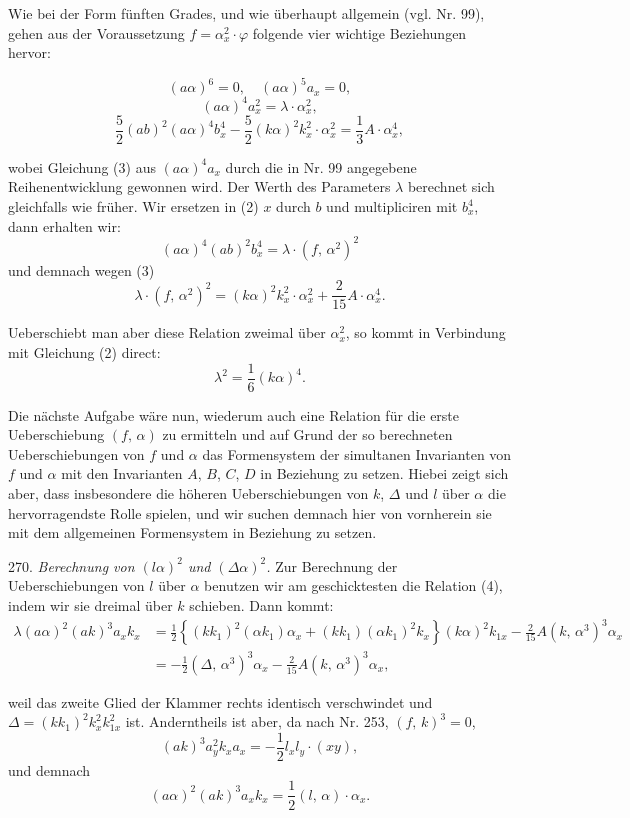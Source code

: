 \documentclass[11pt]{article}
\providecommand{\weberpage}[1]{}
\providecommand{\weq}[2]{\begin{equation}\tag{#1}#2\end{equation}}
\let\Delta\varDelta
\begin{document}
Wie bei der Form fünften Grades, und wie überhaupt allgemein (vgl. Nr. 99), gehen aus der Voraussetzung $f=\alpha_x^2\cdot\varphi$ folgende vier wichtige Beziehungen hervor:


\weberpage{292}

\weq{1}{(a\alpha)^6=0,\quad (a\alpha)^5a_x=0,}
\weq{2}{(a\alpha)^4a_x^2=\lambda\cdot\alpha_x^2,}
\weq{3}{\frac{5}{2}(ab)^2(a\alpha)^4b_x^4 - \frac{5}{2}(k\alpha)^2k_x^2\cdot\alpha_x^2=\frac{1}{3}A\cdot\alpha_x^4,}

wobei Gleichung (3) aus $(a\alpha)^4a_x$ durch die in Nr. 99 angegebene Reihenentwicklung gewonnen wird. Der Werth des Parameters $\lambda$ berechnet sich gleichfalls wie früher. Wir ersetzen in (2) $x$ durch $b$ und multipliciren mit $b_x^4$, dann erhalten wir:
\[
(a\alpha)^4(ab)^2b_x^4=\lambda\cdot(f,\,\alpha^2)^2
\]
und demnach wegen (3)
\weq{4}{\lambda\cdot(f,\,\alpha^2)^2=(k\alpha)^2k_x^2\cdot\alpha_x^2+\frac{2}{15}A\cdot\alpha_x^4.}

Ueberschiebt man aber diese Relation zweimal über $\alpha_x^2$, so kommt in Verbindung mit Gleichung (2) direct:
\weq{5}{\lambda^2=\frac{1}{6}(k\alpha)^4.}

Die nächste Aufgabe wäre nun, wiederum auch eine Relation für die erste Ueberschiebung $(f,\,\alpha)$ zu ermitteln und auf Grund der so berechneten Ueberschiebungen von $f$ und $\alpha$ das Formensystem der simultanen Invarianten von $f$ und $\alpha$ mit den Invarianten $A$, $B$, $C$, $D$ in Beziehung zu setzen. Hiebei zeigt sich aber, dass insbesondere die höheren Ueberschiebungen von $k$, $\Delta$ und $l$ über $\alpha$ die hervorragendste Rolle spielen, und wir suchen demnach hier von vornherein sie mit dem allgemeinen Formensystem in Beziehung zu setzen.

270. \textit{Berechnung von $(l\alpha)^2$ und $(\Delta\alpha)^2$.} Zur Berechnung der Ueberschiebungen von $l$ über $\alpha$ benutzen wir am geschicktesten die Relation (4), indem wir sie dreimal über $k$ schieben. Dann kommt:
\weq{1}{\begin{aligned} \lambda(a\alpha)^2(ak)^3a_xk_x&=\frac{1}{2}\left\{(kk_1)^2(\alpha k_1)\alpha_x+(kk_1)(\alpha k_1)^2k_x\right\}(k\alpha)^2k_{1x}-\frac{2}{15}A(k,\,\alpha^3)^3\alpha_x\\ &=-\frac{1}{2}(\Delta,\,\alpha^3)^3\alpha_x-\frac{2}{15}A(k,\,\alpha^3)^3\alpha_x,\end{aligned}}

weil das zweite Glied der Klammer rechts identisch verschwindet und $\Delta=(kk_1)^2k_x^2k_{1x}^2$ ist. Anderntheils ist aber, da nach Nr. 253, $(f,\,k)^3=0$,
\[
(ak)^3a_y^2k_xa_x=-\frac{1}{2}l_xl_y\cdot(xy),
\]
und demnach
\weq{2}{(a\alpha)^2(ak)^3a_xk_x=\frac{1}{2}(l,\,\alpha)\cdot\alpha_x.}
\end{document}
